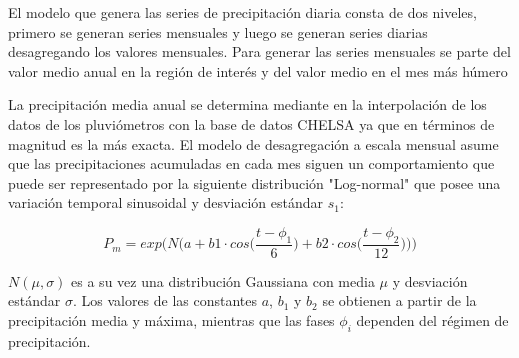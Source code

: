 El modelo que genera las series de precipitación diaria consta de dos niveles, primero se generan series mensuales y
luego se generan series diarias desagregando los valores mensuales.
Para generar las series mensuales se parte del valor medio anual en la región de interés y del valor medio en el 
mes más húmero

La precipitación media anual  se determina mediante en la interpolación de los datos de los
pluviómetros con la base de datos CHELSA ya que en términos de magnitud es la más exacta.
El modelo de desagregación a escala mensual asume que las precipitaciones acumuladas en cada mes siguen un comportamiento
que puede ser representado por la siguiente distribución "Log-normal" que posee una variación temporal sinusoidal y
desviación estándar $s_1$:

\begin{equation}
    P_m=exp\Bigg(N\bigg(a+b1\cdot cos\bigg(\frac{t-\phi_1}{6}\bigg)+b2\cdot cos\bigg(\frac{t-\phi_2}{12}\bigg)\bigg)\Bigg)
\end{equation}

$N(\mu,\sigma)$ es a su vez una distribución Gaussiana con media $\mu$ y desviación estándar $\sigma$. 
Los valores de las constantes $a$, $b_1$ y $b_2$ se obtienen a partir de la precipitación media y máxima, 
mientras que las fases $\phi_i$ dependen del régimen de precipitación.




